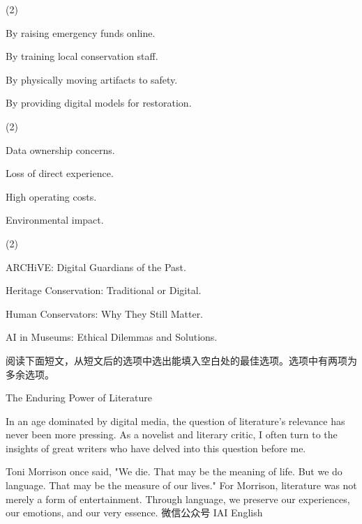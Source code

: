 \documentclass{英语试卷}
\begin{document}
\begin{choices}(2)
  \item By raising emergency funds online.
  \item By training local conservation staff.
  \item By physically moving artifacts to safety.
  \item By providing digital models for restoration.
\end{choices}
\begin{choices}(2)
  \item Data ownership concerns.
  \item Loss of direct experience.
  \item High operating costs.
  \item Environmental impact.
\end{choices}
\begin{choices}(2)
  \item ARCHiVE: Digital Guardians of the Past.
  \item Heritage Conservation: Traditional or Digital.
  \item Human Conservators: Why They Still Matter.
  \item AI in Museums: Ethical Dilemmas and Solutions.
\end{choices}
\par 阅读下面短文，从短文后的选项中选出能填入空白处的最佳选项。选项中有两项为多余选项。\par
\par The Enduring Power of Literature\par
\par In an age dominated by digital media, the question of literature's relevance has never been more pressing.  As a novelist and literary critic, I often turn to the insights of great writers who have delved into this question before me.\par
\par Toni Morrison once said, "We die. That may be the meaning of life. But we do language. That may be the measure of our lives." For Morrison, literature was not merely a form of entertainment.  Through language, we preserve our experiences, our emotions, and our very essence. 微信公众号 IAI English\par
\end{document}
